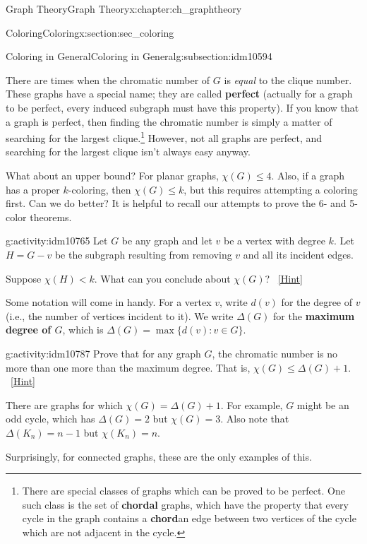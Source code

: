 \documentclass[oneside,10pt,]{book}
\newcommand{\terminology}[1]{\textbf{#1}}
\numberwithin{equation}{chapter}
\def\st{:}
\newcommand{\lt}{<}
\begin{document}
\begin{chapterptx}{Graph Theory}{}{Graph Theory}{}{}{x:chapter:ch_graphtheory}
\begin{sectionptx}{Coloring}{}{Coloring}{}{}{x:section:sec_coloring}
\begin{subsectionptx}{Coloring in General}{}{Coloring in General}{}{}{g:subsection:idm10594}
\par
There are times when the chromatic number of \(G\) is \emph{equal} to the clique number. These graphs have a special name; they are called \terminology{perfect} (actually for a graph to be perfect, every induced subgraph must have this property). If you know that a graph is perfect, then finding the chromatic number is simply a matter of searching for the largest clique.\footnote{There are special classes of graphs which can be proved to be perfect.  One such class is the set of \terminology{chordal} graphs, which have the property that every cycle in the graph contains a \terminology{chord}\textemdash{}an edge between two vertices of the cycle which are not adjacent in the cycle.\label{g:fn:idm10757}} However, not all graphs are perfect, and searching for the largest clique isn't always easy anyway.%
\par
What about an upper bound?  For planar graphs, \(\chi(G) \le 4\).  Also, if a graph has a proper \(k\)-coloring, then \(\chi(G) \le k\), but this requires attempting a coloring first.  Can we do better? It is helpful to recall our attempts to prove the 6- and 5-color theorems.%
\begin{activity}{}{g:activity:idm10765}%
Let \(G\) be any graph and let \(v\) be a vertex with degree \(k\).  Let \(H = G - v\) be the subgraph resulting from removing \(v\) and all its incident edges.%
\par
Suppose \(\chi(H) \lt k\).  What can you conclude about \(\chi(G)\)?%
\qquad~\hfill{\tiny\hyperlink{g:hint:idm10776-back}{[Hint]}}\end{activity}
Some notation will come in handy.  For a vertex \(v\), write \(d(v)\) for the degree of \(v\) (i.e., the number of vertices incident to it).  We write \(\Delta(G)\) for the \terminology{maximum degree of \(G\)}, which is \(\Delta(G) = \max\{d(v) \st v \in G\}\).%
\begin{activity}{}{g:activity:idm10787}%
Prove that for any graph \(G\), the chromatic number is no more than one more than the maximum degree.  That is, \(\chi(G) \le \Delta(G) + 1\).%
\qquad~\hfill{\tiny\hyperlink{g:hint:idm10792-back}{[Hint]}}\end{activity}
There are graphs for which \(\chi(G) = \Delta(G) + 1\).  For example, \(G\) might be an odd cycle, which has \(\Delta(G) = 2\) but \(\chi(G) = 3\).  Also note that \(\Delta(K_n) = n-1\) but \(\chi(K_n) = n\).%
\par
Surprisingly, for connected graphs, these are the only examples of this.%

\end{subsectionptx}
\end{sectionptx}
\end{chapterptx}
\end{document}
